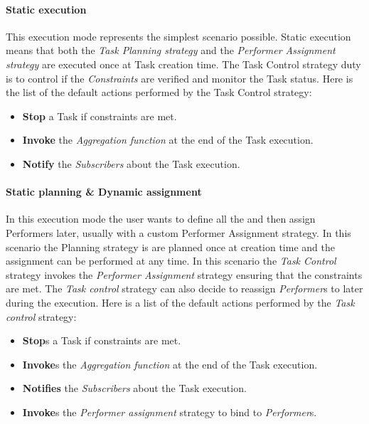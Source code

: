 \paragraph{Static execution}
\label{exec:static-static}
This execution mode represents the simplest scenario possible. Static execution
means that both the \emph{Task Planning strategy} and the \emph{Performer
Assignment strategy} are executed once at Task creation time. The Task Control
strategy duty is to control if the \emph{Constraints} are verified and monitor
the Task status. Here is the list of the default actions performed by the Task
Control strategy: 
\begin{itemize}
	\item \textbf{Stop} a Task if constraints are met.
	\item \textbf{Invoke} the \emph{Aggregation function} at the end of the Task
	execution.
	\item \textbf{Notify} the \emph{Subscribers} about the Task execution.
\end{itemize}




\paragraph{Static \utask{} planning \& Dynamic assignment}
\label{exec:static-dynamic}
In this execution mode the user wants to define all the \utask{} and then
assign Performers later, usually with a custom Performer Assignment strategy.
In this scenario the \utask{} Planning strategy is are planned once at creation
time and the assignment can be performed at any time. In this scenario the \emph{Task
Control} strategy invokes the \emph{Performer Assignment} strategy ensuring that
the constraints are met. The \emph{Task control} strategy can also decide to
reassign \emph{Performer}s to \utask{} later during the execution. Here is a
list of the default actions performed by the \emph{Task control} strategy:
\begin{itemize}
	\item \textbf{Stop}s a Task if constraints are met.
	\item \textbf{Invoke}s the \emph{Aggregation function} at the end of the Task
	execution.
	\item \textbf{Notifies} the \emph{Subscribers} about the Task execution.
	\item \textbf{Invoke}s the \emph{Performer assignment} strategy to bind \utask{}
	to \emph{Performer}s.
\end{itemize}





